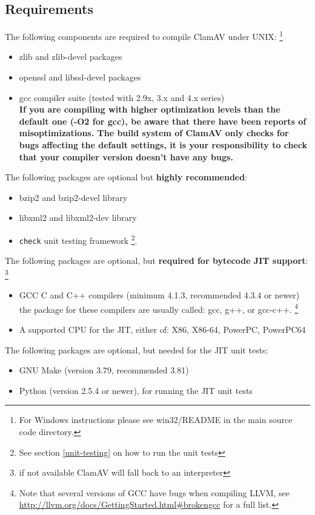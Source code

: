 \documentclass[a4paper,titlepage,12pt]{article}
\begin{document}
    \subsection{Requirements}\label{sec:components}
    The following components are required to compile ClamAV under UNIX:
    \footnote{For Windows instructions please see win32/README in the
    main source code directory.}
    \begin{itemize}
	\item zlib and zlib-devel packages
    \item openssl and libssl-devel packages
	\item gcc compiler suite (tested with 2.9x, 3.x and 4.x series)\\
	      \textbf{If you are compiling with higher optimization levels
	      than the default one (\hbox{-O2} for gcc), be aware that there
	      have been reports of misoptimizations. The build system of ClamAV
	      only checks for bugs affecting the default settings, it is your
	      responsibility to check that your compiler version doesn't
	      have any bugs.}
    \end{itemize}
    The following packages are optional but \textbf{highly recommended}:
    \begin{itemize}
	\item bzip2 and bzip2-devel library
        \item libxml2 and libxml2-dev library
	\item \verb+check+ unit testing framework \footnote{See section \ref{unit-testing} on how to run the unit tests}.
    \end{itemize}
    The following packages are optional, but \textbf{required for bytecode JIT support}:
    \footnote{if not available ClamAV will fall back to an interpreter}
    \begin{itemize}
        \item GCC C and C++ compilers (minimum 4.1.3, recommended 4.3.4 or newer)\\
	    the package for these compilers are usually called: gcc, g++, or gcc-c++.
	    \footnote{Note that several versions of GCC have bugs when compiling LLVM, see
		\url{http://llvm.org/docs/GettingStarted.html#brokengcc} for a
		    full list.}
	\item A supported CPU for the JIT, either of: X86, X86-64, PowerPC, PowerPC64
    \end{itemize}
    The following packages are optional, but needed for the JIT unit tests:
    \begin{itemize}
     \item GNU Make (version 3.79, recommended 3.81)
     \item Python (version 2.5.4 or newer), for running the JIT unit tests
    \end{itemize}
\end{document}
